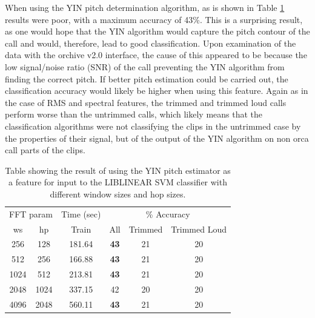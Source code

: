 When using the YIN pitch determination algorithm, as is shown in Table
\ref{table:calls-different-yin} results were poor, with a maximum
accuracy of 43\%.  This is a surprising result, as one would hope that
the YIN algorithm would capture the pitch contour of the call and
would, therefore, lead to good classification.  Upon examination of
the data with the orchive v2.0 interface, the cause of this appeared
to be because the low signal/noise ratio (SNR) of the call preventing
the YIN algorithm from finding the correct pitch.  If better pitch
estimation could be carried out, the classification accuracy would
likely be higher when using this feature.  Again as in the case of RMS
and spectral features, the trimmed and trimmed loud calls perform
worse than the untrimmed calls, which likely means that the
classification algorithms were not classifying the clips in the
untrimmed case by the properties of their signal, but of the output of
the YIN algorithm on non orca call parts of the clips.

\begin{table}
\begin{tabular}{|c|c|c|c|c|c|}
\hline
\multicolumn{2}{|c|}{FFT param} & \multicolumn{1}{c|}{Time (sec)} & \multicolumn{3}{c|}{\% Accuracy} \\
\hhline{|-|-|-|-|-|-|}
ws & hp & Train & All & Trimmed & Trimmed Loud \\
\hhline{|=|=|=|=|=|=|}
256 & 128      &   181.64  &   \textbf{43} & 21 & 20 \\
512 & 256      &   166.88  &   \textbf{43} & 21 & 20 \\
1024 & 512     &   213.81  &   \textbf{43} & 21 & 20 \\
2048 & 1024    &   337.15  &   42          & 20 & 20 \\
4096 & 2048    &   560.11  &   \textbf{43} & 21 & 20 \\
\hline
\end{tabular}
\caption{Table showing the result of using the YIN pitch estimator as
  a feature for input to the LIBLINEAR SVM classifier with different
  window sizes and hop sizes.}
\label{table:calls-different-yin}
\end{table}

